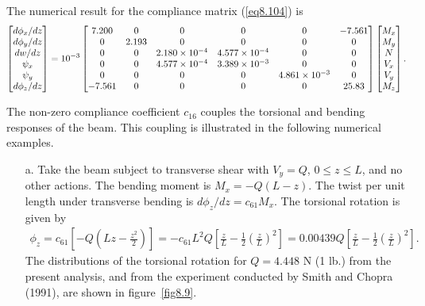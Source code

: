 \documentclass{AeroStructure-ERJohnson}
\begin{document}
\begin{example*}
The numerical result for the compliance matrix (\ref{eq8.104}) is
\begin{align*}
\left[\begin{array}{@{}c@{}}d \phi_{x}/ d z\\
d \phi_{y}/ d z\\
d w/ d z\\
\psi_{x}\\
\psi_{y}\\
d \phi_{z}/ d
z\end{array}\right]=10^{-3}\left[\begin{array}{@{}cccccc@{}}7.200
& 0 & 0 & 0 & 0 & -7.561\\
0 & 2.193 & 0 & 0 & 0 & 0\\
0 & 0 &
2.180 \times 10^{-4} & 4.577 \times 10^{-4} & 0 & 0\\
0 & 0 &
4.577 \times 10^{-4} & 3.389 \times 10^{-3} & 0 & 0\\
0 & 0 & 0 &
0 & 4.861 \times 10^{-3} & 0\\
-7.561 & 0 & 0 & 0 & 0 &
25.83\end{array}\right]\left[\begin{array}{@{}c@{}}M_{x}\\
M_{y}\\
N\\
V_{x}\\
V_{y}\\
M_{z}\end{array}\right].
\end{align*}
\vspace*{2pt}
\clearpage

The non-zero compliance coefficient $c_{16}$ couples the torsional
and bending responses of the beam. This coupling is illustrated in
the following numerical examples.
\begin{enumerate}[a.]\leftskip=3pt
\item[a.] Take the beam subject to transverse shear with $V_{y}=Q$, $0
\leq z \leq L$, and no other actions. The bending moment is
$M_{x}=-Q(L-z)$. The twist per unit length under transverse
bending is $d \phi_{z}/ d z=c_{61} M_{x}$. The torsional rotation
is given by
\begin{align*}
\phi_{z}=c_{61}\left[-Q\left(L
z-\frac{z^{2}}{2}\right)\right]=-c_{61} L^{2}
Q\left[\frac{z}{L}-\frac{1}{2}\left(\frac{z}{L}\right)^{2}\right]=0.00439
Q\left[\frac{z}{L}-\frac{1}{2}\left(\frac{z}{L}\right)^{2}\right].
\end{align*}
The distributions of the torsional rotation for $Q = 4.448$
N (1 lb.) from the present analysis, and from the experiment
conducted by Smith and Chopra (1991), are shown in figure~\ref{fig8.9}.


\end{enumerate}
\end{example*}
\end{document}
